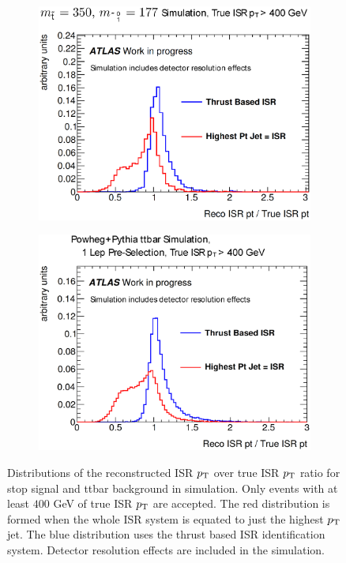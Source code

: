 \begin{figure}[h!]
\centering
    \begin{subfigure}[b]{0.40\textwidth}
    \includegraphics[width=\textwidth]{./figures/strategy/ThrustAlgoEfficiency.eps}
        \caption{ }
    \end{subfigure}
    \begin{subfigure}[b]{0.40\textwidth}
\includegraphics[width=\textwidth]{./figures/strategy/ThrustAlgoEfficiency_ttbar.eps}
        \caption{ }
    \end{subfigure}
\caption[Distributions of the reconstructed ISR $\pt$ over true ISR $\pt$ ratio for stop signal and ttbar background in simulation]{Distributions of the reconstructed ISR $\pt$ over true ISR $\pt$ ratio for stop signal and ttbar background in simulation.  Only events with at least $400$ GeV of true ISR $\pt$ are accepted.  The red distribution is formed when the whole ISR system is equated to just the highest $\pt$ jet.  The blue distribution uses the thrust based ISR identification system. Detector resolution effects are included in the simulation. }
 \label{fig:ISRPerformanceIntro}
\end{figure}

